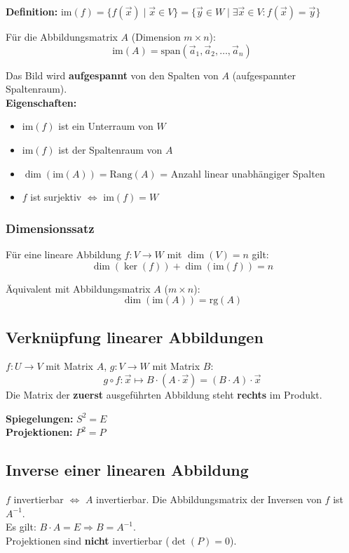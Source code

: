 \textbf{Definition:} $\text{im}(f) = \{f(\vec{x}) \mid \vec{x} \in V\} = \{\vec{y} \in W \mid \exists \vec{x} \in V: f(\vec{x}) = \vec{y}\}$

Für die Abbildungsmatrix $A$ (Dimension $m \times n$):
$$\text{im}(A) = \text{span}(\vec{a}_1, \vec{a}_2, \ldots, \vec{a}_n)$$

Das Bild wird \textbf{aufgespannt} von den Spalten von $A$ (aufgespannter Spaltenraum). \\[6pt]

\textbf{Eigenschaften:}
\begin{itemize}
    \item $\text{im}(f)$ ist ein Unterraum von $W$
    \item $\text{im}(f)$ ist der Spaltenraum von $A$
    \item $\dim(\text{im}(A)) = \text{Rang}(A)$ = Anzahl linear unabhängiger Spalten
    \item $f$ ist surjektiv $\Leftrightarrow$ $\text{im}(f) = W$
\end{itemize}

\subsubsection*{Dimensionssatz}
Für eine lineare Abbildung $f: V \to W$ mit $\dim(V) = n$ gilt:
$$\dim(\ker(f)) + \dim(\text{im}(f)) = n$$

Äquivalent mit Abbildungsmatrix $A$ ($m \times n$):
$$\dim(\text{im}(A)) = \text{rg}(A)$$


\subsection{Verknüpfung linearer Abbildungen}
$f: U \to V$ mit Matrix $A$, $g: V \to W$ mit Matrix $B$:
$$g \circ f: \vec{x} \mapsto B \cdot (A \cdot \vec{x}) = (B \cdot A) \cdot \vec{x}$$
Die Matrix der \textbf{zuerst} ausgeführten Abbildung steht \textbf{rechts} im Produkt.

\textbf{Spiegelungen:} $S^2 = E$ \\
\textbf{Projektionen:} $P^2 = P$

\subsection{Inverse einer linearen Abbildung}
$f$ invertierbar $\Leftrightarrow$ $A$ invertierbar. Die Abbildungsmatrix der Inversen von $f$ ist $A^{-1}$.\\
Es gilt: $B \cdot A = E \Rightarrow B = A^{-1}$.\\
Projektionen sind \textbf{nicht} invertierbar ($\det(P) = 0$).

